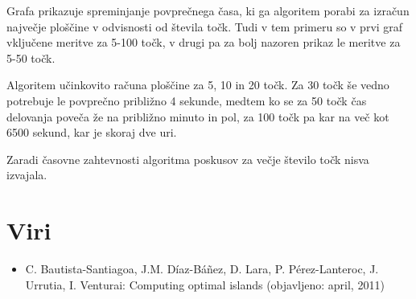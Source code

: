 \documentclass[a4, 12pt]{article}
\begin{document}
Grafa prikazuje spreminjanje povprečnega časa, ki ga algoritem porabi za izračun največje ploščine v odvisnosti od števila točk. Tudi v tem primeru so v prvi graf vključene meritve za 5-100 točk, v drugi pa za bolj nazoren prikaz le meritve za 5-50 točk.

Algoritem učinkovito računa ploščine za 5, 10 in 20 točk. Za 30 točk še vedno potrebuje le povprečno približno 4 sekunde, medtem ko se za 50 točk čas delovanja poveča že na približno minuto in pol, za 100 točk pa kar na več kot 6500 sekund, kar je skoraj dve uri. 

Zaradi časovne zahtevnosti algoritma poskusov za večje število točk nisva izvajala.

\section{Viri}

\begin{itemize}
	\item C. Bautista-Santiagoa, J.M. Díaz-Báñez, D. Lara, P. Pérez-Lanteroc, J. Urrutia, I. Venturai: Computing optimal islands (objavljeno: april, 2011)

\end{itemize}
\end{document}
